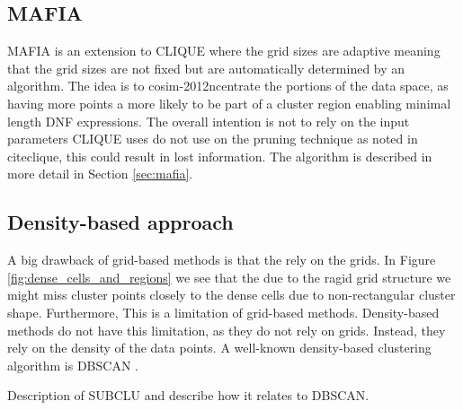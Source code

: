 \subsection{MAFIA}
MAFIA is an extension to CLIQUE where the grid sizes are adaptive meaning that the grid sizes are not fixed but are automatically determined by an algorithm. The idea is to cosim-2012ncentrate the portions of the data space, as having more points a more likely to be part of a cluster region enabling minimal length DNF expressions. The overall intention is not to rely on the input parameters CLIQUE uses do not use on the pruning technique as noted in cite{clique}, this could result in lost information. The algorithm is described in more detail in Section \ref{sec:mafia}.

\subsection{Density-based approach}
A big drawback of grid-based methods is that the rely on the grids. In Figure \ref{fig:dense_cells_and_regions} we see that the due to the ragid grid structure we might miss cluster points closely to the dense cells due to non-rectangular cluster shape. Furthermore, This is a limitation of grid-based methods. Density-based methods do not have this limitation, as they do not rely on grids. Instead, they rely on the density of the data points. A well-known density-based clustering algorithm is DBSCAN \cite{dbscan}.


Description of SUBCLU and describe how it relates to DBSCAN.